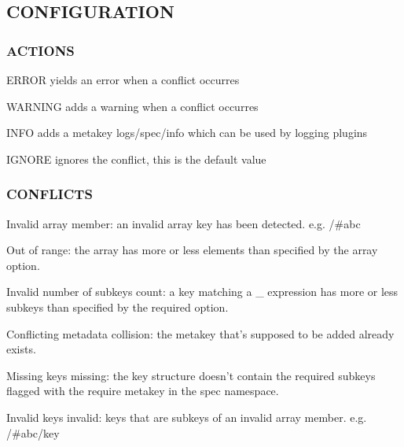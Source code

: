 \subsection*{C\+O\+N\+F\+I\+G\+U\+R\+A\+T\+I\+O\+N}

\subsubsection*{A\+C\+T\+I\+O\+N\+S}


\begin{DoxyItemize}
\item {\ttfamily E\+R\+R\+O\+R} yields an error when a conflict occurres
\item {\ttfamily W\+A\+R\+N\+I\+N\+G} adds a warning when a conflict occurres
\item {\ttfamily I\+N\+F\+O} adds a metakey {\ttfamily logs/spec/info} which can be used by logging plugins
\item {\ttfamily I\+G\+N\+O\+R\+E} ignores the conflict, this is the default value
\end{DoxyItemize}

\subsubsection*{C\+O\+N\+F\+L\+I\+C\+T\+S}


\begin{DoxyItemize}
\item Invalid array {\ttfamily member}\+: an invalid array key has been detected. e.\+g. {\ttfamily /\#abc}
\item Out of {\ttfamily range}\+: the array has more or less elements than specified by the {\ttfamily array} option.
\item Invalid number of subkeys {\ttfamily count}\+: a key matching a {\ttfamily \+\_\+} expression has more or less subkeys than specified by the {\ttfamily required} option.
\item Conflicting metadata {\ttfamily collision}\+: the metakey that's supposed to be added already exists.
\item Missing keys {\ttfamily missing}\+: the key structure doesn't contain the required subkeys flagged with the {\ttfamily require} metakey in the {\ttfamily spec} namespace.
\item Invalid keys {\ttfamily invalid}\+: keys that are subkeys of an invalid array member. e.\+g. {\ttfamily /\#abc/key}
\end{DoxyItemize}

